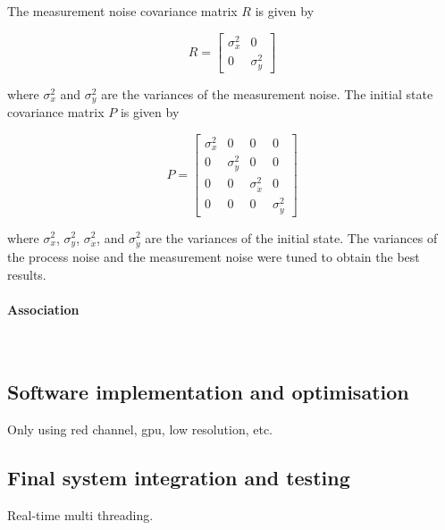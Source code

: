 The measurement noise covariance matrix $R$ is given by

\begin{equation}
    R = \begin{bmatrix}
        \sigma_{x}^2 & 0            \\
        0            & \sigma_{y}^2
    \end{bmatrix}
    \label{eq:kalman_filter_measurement_noise_covariance_matrix}
\end{equation}

where $\sigma_{x}^2$ and $\sigma_{y}^2$ are the variances of the measurement noise. The initial state covariance matrix $P$ is given by

\begin{equation}
    P = \begin{bmatrix}
        \sigma_{x}^2 & 0            & 0                  & 0                  \\
        0            & \sigma_{y}^2 & 0                  & 0                  \\
        0            & 0            & \sigma_{\dot{x}}^2 & 0                  \\
        0            & 0            & 0                  & \sigma_{\dot{y}}^2
    \end{bmatrix}
    \label{eq:kalman_filter_initial_state_covariance_matrix}
\end{equation}

where $\sigma_{x}^2$, $\sigma_{y}^2$, $\sigma_{\dot{x}}^2$, and $\sigma_{\dot{y}}^2$ are the variances of the initial state. The variances of the process noise and the measurement noise were tuned to obtain the best results.

\paragraph{Association}\mbox{}\\


\subsection{Software implementation and optimisation}
Only using red channel, \gls{gpu}, low resolution, etc.


\subsection{Final system integration and testing}
Real-time multi threading.

\newpage


